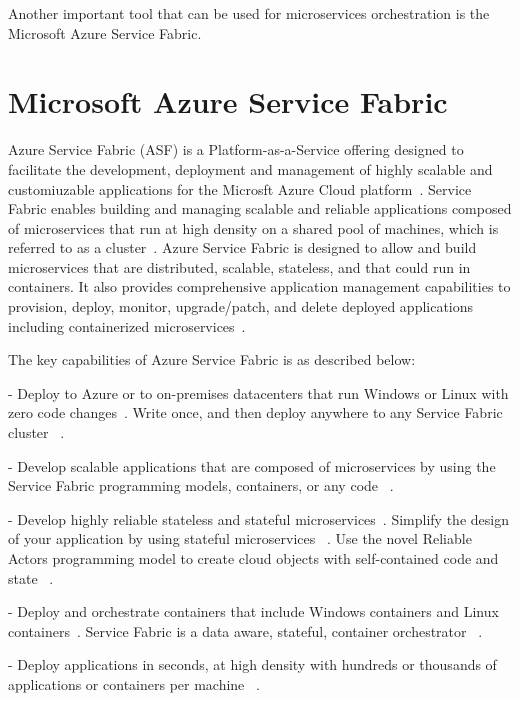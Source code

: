 Another important tool that can be used for microservices
orchestration is the Microsoft Azure Service Fabric.



\section{Microsoft Azure Service Fabric}
Azure Service Fabric (ASF) is a Platform-as-a-Service offering
designed to facilitate the development, deployment and management of
highly scalable and customiuzable applications for the Microsft Azure
Cloud platform~\cite{hid-sp18-501-definition}. Service Fabric enables
building and managing scalable and reliable applications composed of
microservices that run at high density on a shared pool of machines,
which is referred to as a cluster~\cite{hid-sp18-501-overview}. 
Azure Service Fabric is designed to allow and build microservices that are
distributed, scalable, stateless, and that could run in containers.
It also provides
comprehensive application management capabilities to provision,
deploy, monitor, upgrade/patch, and delete deployed applications
including containerized microservices~\cite{hid-sp18-501-overview}.

The key capabilities of Azure Service Fabric is as described
below:


- Deploy to Azure or to on-premises 
  datacenters that run Windows or Linux with 
  zero code changes~\cite{hid-sp18-501-overview}. 
  Write once, and then 
  deploy anywhere to any Service Fabric cluster
~\cite{hid-sp18-501-overview}.
  

- Develop scalable applications that are 
  composed of microservices by
  using the Service Fabric programming models, 
  containers, or any code
~\cite{hid-sp18-501-overview}.

- Develop highly reliable stateless and stateful
  microservices~\cite{hid-sp18-501-overview}. 
  Simplify the design of 
  your application by using stateful microservices
~\cite{hid-sp18-501-overview}.
  Use the novel Reliable Actors programming
  model to create cloud objects with 
  self-contained code and state
~\cite{hid-sp18-501-overview}.

- Deploy and orchestrate containers that 
  include Windows containers
  and Linux containers~\cite{hid-sp18-501-overview}. 
  Service Fabric 
  is a data aware, stateful, container orchestrator
~\cite{hid-sp18-501-overview}.

- Deploy applications in seconds, at high 
  density with hundreds or  thousands of 
  applications or containers per machine
~\cite{hid-sp18-501-overview}.

